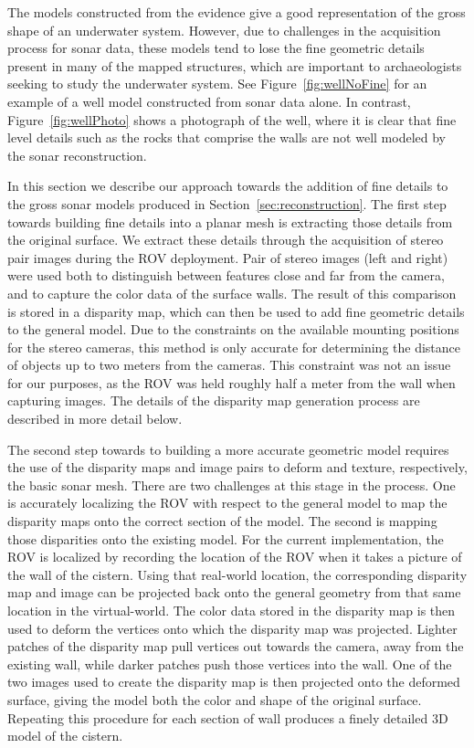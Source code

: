 \documentclass[a4paper,twoside]{article}
\begin{document}
\noindent The models constructed from the evidence give a good representation of the gross shape of an underwater system. However, due to challenges in the acquisition process for sonar data, these models tend to lose the fine geometric details present in many of the mapped structures, which are important to archaeologists seeking to study the underwater system. See Figure~\ref{fig:wellNoFine} for an example of a well model constructed from sonar data alone. In contrast, Figure~\ref{fig:wellPhoto} shows a photograph of the well, where it is clear that fine level details such as the rocks that comprise the walls are not well modeled by the sonar reconstruction.

In this section we describe our approach towards the addition of fine details to the gross sonar models produced in Section~\ref{sec:reconstruction}.
The first step towards building fine details into a planar mesh is extracting those details from the original surface. 
We extract these details through the acquisition of stereo pair images during the ROV deployment.
Pair of stereo images (left and right) were used both to distinguish between features close and far from the camera, and to capture the color data of the surface walls.
The result of this comparison is stored in a disparity map, which can then be used to add fine geometric details to the general model.  
Due to the constraints on the available mounting positions for the stereo cameras, this method is only accurate for determining the distance of objects up to two meters from the cameras. This constraint was not an issue for our purposes, as the ROV was held roughly half a meter from the wall when capturing images.
The details of the disparity map generation process are described in more detail below.

The second step towards to building a more accurate geometric model requires the use of the disparity maps and image pairs to deform and texture, respectively, the basic sonar mesh. There are two challenges at this stage in the process.  One is accurately localizing the ROV with respect to the general model to map the disparity maps onto the correct section of the model. The second is mapping those disparities onto the existing model.
For the current implementation, the ROV is localized by recording the location of the ROV when it takes a picture of the wall of the cistern.  
Using that real-world location, the corresponding disparity map and image can be projected back onto the general geometry from that same location in the virtual-world.
The color data stored in the disparity map is then used to deform the vertices onto which the disparity map was projected.
Lighter patches of the disparity map pull vertices out towards the camera, away from the existing wall, while darker patches push those vertices into the wall.
One of the two images used to create the disparity map is then projected onto the deformed surface, giving the model both the color and shape of the original surface. Repeating this procedure for each section of wall produces a finely detailed 3D model of the cistern.
\end{document}
